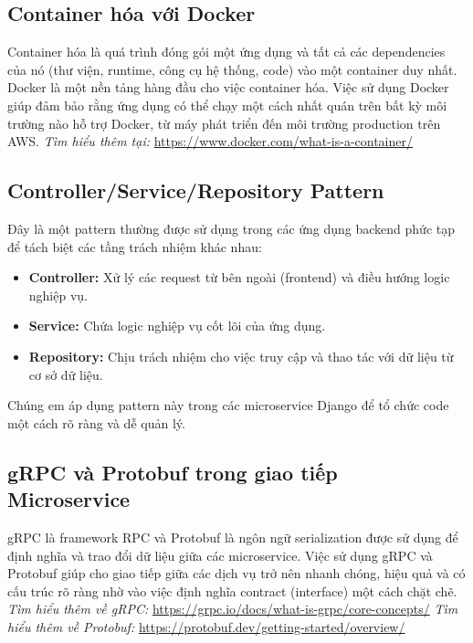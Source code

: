 \subsection{Container hóa với Docker}
Container hóa là quá trình đóng gói một ứng dụng và tất cả các dependencies của nó (thư viện, runtime, công cụ hệ thống, code) vào một container duy nhất. Docker là một nền tảng hàng đầu cho việc container hóa. Việc sử dụng Docker giúp đảm bảo rằng ứng dụng có thể chạy một cách nhất quán trên bất kỳ môi trường nào hỗ trợ Docker, từ máy phát triển đến môi trường production trên AWS.
\textit{Tìm hiểu thêm tại:} \url{https://www.docker.com/what-is-a-container/}

\subsection{Controller/Service/Repository Pattern}
Đây là một pattern thường được sử dụng trong các ứng dụng backend phức tạp để tách biệt các tầng trách nhiệm khác nhau:
\begin{itemize}
    \item \textbf{Controller:} Xử lý các request từ bên ngoài (frontend) và điều hướng logic nghiệp vụ.
    \item \textbf{Service:} Chứa logic nghiệp vụ cốt lõi của ứng dụng.
    \item \textbf{Repository:} Chịu trách nhiệm cho việc truy cập và thao tác với dữ liệu từ cơ sở dữ liệu.
\end{itemize}
Chúng em áp dụng pattern này trong các microservice Django để tổ chức code một cách rõ ràng và dễ quản lý.
\begin{comment}
\textit{Tìm hiểu thêm (ví dụ về pattern tương tự trong Java Spring):} \url{https://www.baeldung.com/spring-data-jpa-tutorial} (Bạn có thể tìm kiếm các tài liệu tương tự cho Python/Django)
\end{comment}

\subsection{gRPC và Protobuf trong giao tiếp Microservice}
gRPC là framework RPC và Protobuf là ngôn ngữ serialization được sử dụng để định nghĩa và trao đổi dữ liệu giữa các microservice. Việc sử dụng gRPC và Protobuf giúp cho giao tiếp giữa các dịch vụ trở nên nhanh chóng, hiệu quả và có cấu trúc rõ ràng nhờ vào việc định nghĩa contract (interface) một cách chặt chẽ.
\textit{Tìm hiểu thêm về gRPC:} \url{https://grpc.io/docs/what-is-grpc/core-concepts/}
\textit{Tìm hiểu thêm về Protobuf:} \url{https://protobuf.dev/getting-started/overview/}